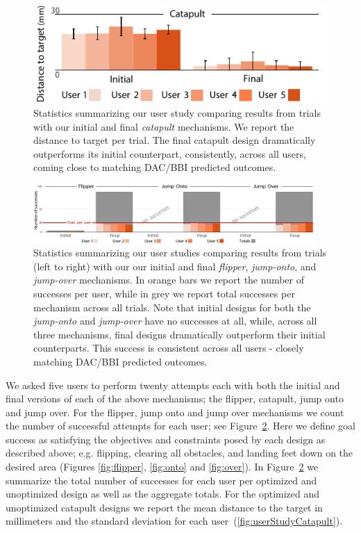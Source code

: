 \begin{figure}[h!]
\centering
\includegraphics[width=0.7\columnwidth]{./figs/UserStudyCatapult.pdf}
\caption{Statistics summarizing our user study comparing results from trials with our initial and final \emph{catapult} mechanisms. We report the distance to target per trial. The final catapult design dramatically outperforms its initial counterpart, consistently, across all users, coming close to matching DAC/BBI predicted outcomes.}
\label{fig:userStudyCatapult}
\end{figure}

\begin{figure}[hpt!]
\centering
\includegraphics[width=0.95\textwidth]{./figs/UserStudyJumpers.pdf}
\caption{
Statistics summarizing our user studies comparing results from trials (left to right) with our our initial and final  \emph{flipper}, \emph{jump-onto}, and \emph{jump-over} mechanisms. In orange bars we report the number of successes per user, while in grey we report total successes per mechanism across all trials. Note that  initial designs for both the \emph{jump-onto} and \emph{jump-over} have no successes at all, while, across all three mechanisms, final designs dramatically outperform their initial counterparts. This success is consistent across all users - closely matching DAC/BBI predicted outcomes.}
\label{fig:userStudyJumpers}
\end{figure}

We asked five users to perform twenty attempts each with both the initial and final versions of each of the above mechanisms; the flipper, catapult, jump onto and jump over. For the flipper, jump onto and jump over mechanisms we count the number of successful attempts for each user; see Figure~\ref{fig:userStudyJumpers}. Here we define goal success as satisfying the objectives and constraints posed by each design as described above; e.g. flipping, clearing all obstacles, and landing feet down on the desired area (Figures \ref{fig:flipper}, \ref{fig:onto} and \ref{fig:over}).
In Figure~\ref{fig:userStudyJumpers} we summarize the total number of successes for each user per optimized and unoptimized design as well as the aggregate totals. For the optimized and unoptimized catapult designs we report the mean distance to the target in millimeters and the standard deviation for each user~(\autoref{fig:userStudyCatapult}). 

